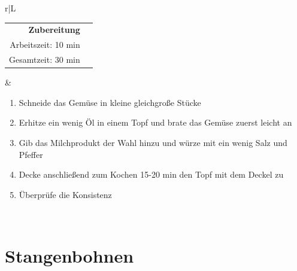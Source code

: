 \documentclass[a4paper, 12pt]{scrbook} 								%
\numberwithin{equation}{section} 									%
\begin{document}
\begin{tabularx}{\textwidth}{r|L}
		\begin{tabular}[t]{rr}
			\textbf{Zubereitung}	\\
			Arbeitszeit: 10 min	\\
			Gesamtzeit:	30 min		\\
		\end{tabular}			&	\begin{enumerate}[]
										\item Schneide das Gemüse in kleine gleichgroße Stücke
										\item Erhitze ein wenig Öl in einem Topf und brate das Gemüse zuerst leicht an
										\item Gib das Milchprodukt der Wahl hinzu und würze mit ein wenig Salz und Pfeffer
										\item Decke anschließend zum Kochen 15-20 min den Topf mit dem Deckel zu
										\item Überprüfe die Konsistenz
									\end{enumerate}	\\
	\end{tabularx}
	\newpage


	\section{Stangenbohnen}	\label{stangenbohnen}
\end{document}
